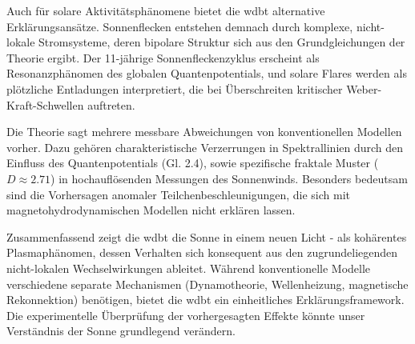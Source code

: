 Auch für solare Aktivitätsphänomene bietet die \gls{wdbt} alternative Erklärungsansätze. Sonnenflecken entstehen demnach durch komplexe, nicht-lokale Stromsysteme, deren bipolare
Struktur sich aus den Grundgleichungen der Theorie ergibt. Der 11-jährige Sonnenfleckenzyklus erscheint als Resonanzphänomen des globalen Quantenpotentials, und solare Flares
werden als plötzliche Entladungen interpretiert, die bei Überschreiten kritischer Weber-Kraft-Schwellen auftreten.

Die Theorie sagt mehrere messbare Abweichungen von konventionellen Modellen vorher. Dazu gehören charakteristische Verzerrungen in Spektrallinien durch den Einfluss des
Quantenpotentials (Gl. 2.4), sowie spezifische fraktale Muster ($D \approx 2.71$) in hochauflösenden Messungen des Sonnenwinds. Besonders bedeutsam sind die Vorhersagen anomaler
Teilchenbeschleunigungen, die sich mit magnetohydrodynamischen Modellen nicht erklären lassen.

Zusammenfassend zeigt die \gls{wdbt} die Sonne in einem neuen Licht - als kohärentes Plasmaphänomen, dessen Verhalten sich konsequent aus den zugrundeliegenden nicht-lokalen
Wechselwirkungen ableitet. Während konventionelle Modelle verschiedene separate Mechanismen (Dynamotheorie, Wellenheizung, magnetische Rekonnektion) benötigen, bietet die \gls{wdbt}
ein einheitliches Erklärungsframework. Die experimentelle Überprüfung der vorhergesagten Effekte könnte unser Verständnis der Sonne grundlegend verändern.
